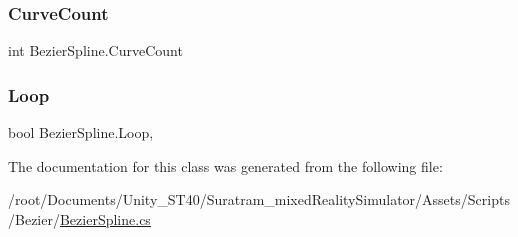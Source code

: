 \subsubsection{\texorpdfstring{Curve\+Count}{CurveCount}}
{\footnotesize\ttfamily int Bezier\+Spline.\+Curve\+Count\hspace{0.3cm}{\ttfamily [get]}}

\mbox{\label{classBezierSpline_a9b13fb8edeb86c6166fbd091b044eb63}} 
\subsubsection{\texorpdfstring{Loop}{Loop}}
{\footnotesize\ttfamily bool Bezier\+Spline.\+Loop\hspace{0.3cm}{\ttfamily [get]}, {\ttfamily [set]}}



The documentation for this class was generated from the following file\+:\begin{DoxyCompactItemize}
\item 
/root/\+Documents/\+Unity\+\_\+\+S\+T40/\+Suratram\+\_\+mixed\+Reality\+Simulator/\+Assets/\+Scripts/\+Bezier/\hyperlink{BezierSpline_8cs}{Bezier\+Spline.\+cs}\end{DoxyCompactItemize}
